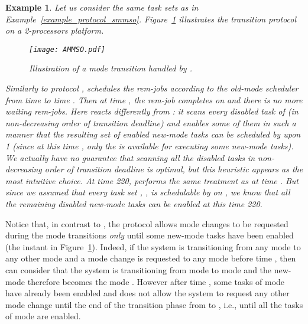 \documentclass{article}
\newtheorem{validity test}{Validity Test}
\newtheorem{Example}{Example}
\begin{document}
\begin{Example}
\label{example:AMMSO}
Let us consider the same task sets as in Example~\ref{example_protocol_smmso}. Figure~\ref{fig:Multimode:AMMSO_example} illustrates the  transition protocol on a 2-processors platform. 
\begin{figure}[h!]
\begin{center}
\texttt{[image: AMMSO.pdf]}
\caption{Illustration of a mode transition handled by .}
\label{fig:Multimode:AMMSO_example}
\end{center}
\end{figure}

Similarly to protocol ,  schedules the rem-jobs according to the old-mode scheduler from time  to time . Then at time , the rem-job  completes on   and there is no more waiting rem-jobs. Here  reacts differently from : it scans every disabled task of  (in non-decreasing order of transition deadline) and enables some of them in such a manner that the resulting set of enabled new-mode tasks can be scheduled by  upon 1  (since at this time , only the   is available for executing some new-mode tasks). We actually have no guarantee that scanning all the disabled tasks in non-decreasing order of transition deadline is optimal, but this \emph{heuristic} appears as the most intuitive choice. At time 220,  performs the same treatment as at time . But since we assumed that every task set , , is schedulable by  on , we know that \emph{all} the remaining disabled new-mode tasks can be enabled at this time 220. 
\end{Example}

Notice that, in contrast to , the protocol  allows mode changes to be requested during the mode transitions \emph{only} until some new-mode tasks have been enabled (the instant  in Figure~\ref{fig:Multimode:AMMSO_example}). Indeed, if the system is transitioning from any mode  to any other mode  and a mode change is requested to any mode  before time , then  can consider that the system is transitioning from mode  to mode  and the new-mode therefore becomes the mode . However after time , some tasks of mode  have already been enabled and  does not allow the system to request any other mode change until the end of the transition phase from  to , i.e., until all the tasks of mode  are enabled. 
\end{document}
